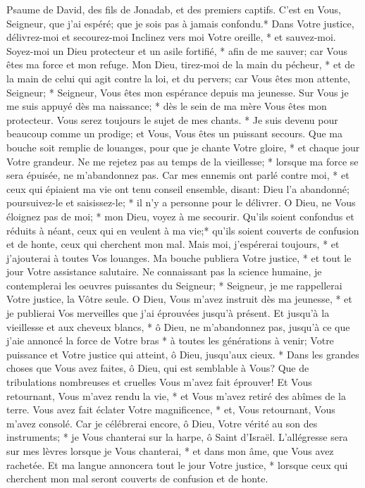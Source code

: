 Psaume de David, des fils de Jonadab, et des premiers captifs. C'est en Vous, Seigneur, que j'ai espéré; que je sois pas à jamais confondu.*
Dans Votre justice, délivrez-moi et secourez-moi Inclinez vers moi Votre oreille, * et sauvez-moi.
Soyez-moi un Dieu protecteur et un asile fortifié, * afin de me sauver; car Vous êtes ma force et mon refuge.
Mon Dieu, tirez-moi de la main du pécheur, * et de la main de celui qui agit contre la loi, et du pervers;
car Vous êtes mon attente, Seigneur; * Seigneur, Vous êtes mon espérance depuis ma jeunesse.
Sur Vous je me suis appuyé dès ma naissance; * dès le sein de ma mère Vous êtes mon protecteur. Vous serez toujours le sujet de mes chants. *
Je suis devenu pour beaucoup comme un prodige; et Vous, Vous êtes un puissant secours.
Que ma bouche soit remplie de louanges, pour que je chante Votre gloire, * et chaque jour Votre grandeur.
Ne me rejetez pas au temps de la vieillesse; * lorsque ma force se sera épuisée, ne m'abandonnez pas.
Car mes ennemis ont parlé contre moi, * et ceux qui épiaient ma vie ont tenu conseil ensemble,
disant: Dieu l'a abandonné; poursuivez-le et saisissez-le; * il n'y a personne pour le délivrer.
O Dieu, ne Vous éloignez pas de moi; * mon Dieu, voyez à me secourir.
Qu'ils soient confondus et réduits à néant, ceux qui en veulent à ma vie;* qu'ils soient couverts de confusion et de honte, ceux qui cherchent mon mal.
Mais moi, j'espérerai toujours, * et j'ajouterai à toutes Vos louanges.
Ma bouche publiera Votre justice, * et tout le jour Votre assistance salutaire. Ne connaissant pas la science humaine,
je contemplerai les oeuvres puissantes du Seigneur; * Seigneur, je me rappellerai Votre justice, la Vôtre seule.
O Dieu, Vous m'avez instruit dès ma jeunesse, * et je publierai Vos merveilles que j'ai éprouvées jusqu'à présent.
Et jusqu'à la vieillesse et aux cheveux blancs, * ô Dieu, ne m'abandonnez pas, jusqu'à ce que j'aie annoncé la force de Votre bras * à toutes les générations à venir; Votre puissance
et Votre justice qui atteint, ô Dieu, jusqu'aux cieux. * Dans les grandes choses que Vous avez faites, ô Dieu, qui est semblable à Vous?
Que de tribulations nombreuses et cruelles Vous m'avez fait éprouver! Et Vous retournant, Vous m'avez rendu la vie, * et Vous m'avez retiré des abîmes de la terre.
Vous avez fait éclater Votre magnificence, * et, Vous retournant, Vous m'avez consolé.
Car je célébrerai encore, ô Dieu, Votre vérité au son des instruments; * je Vous chanterai sur la harpe, ô Saint d'Israël.
L'allégresse sera sur mes lèvres lorsque je Vous chanterai, * et dans mon âme, que Vous avez rachetée.
Et ma langue annoncera tout le jour Votre justice, * lorsque ceux qui cherchent mon mal seront couverts de confusion et de honte.

